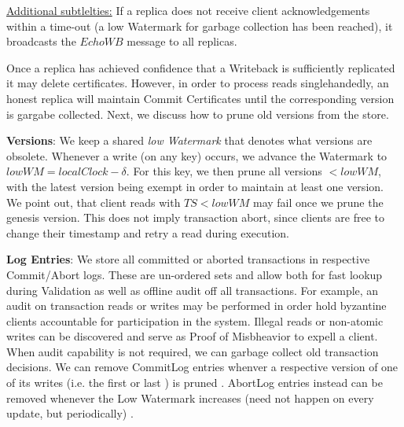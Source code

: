 \underline{Additional subtlelties:} If a replica does not receive client acknowledgements within a time-out (a low Watermark for garbage collection has been reached), it broadcasts the $EchoWB$ message to all replicas. 

Once a replica has achieved confidence that a Writeback is sufficiently replicated it may delete certificates. However, in order to process reads singlehandedly, an honest replica will maintain Commit Certificates until the corresponding version is gargabe collected. Next, we discuss how to prune old versions from the store.



\textbf{Versions}: We keep a shared \textit{low Watermark} that denotes what versions are obsolete. Whenever  a write (on any key) occurs, we advance the Watermark to $lowWM = localClock - \delta$. For this key, we then prune all versions $< lowWM$, with the latest version being exempt in order to maintain at least one version.  We point out, that client reads with $TS < lowWM$ may fail once we prune the genesis version. This does not imply transaction abort, since clients are free to change their timestamp and retry a read during execution.

\textbf{Log Entries}: We store all committed or aborted transactions in respective Commit/Abort logs. These are un-ordered sets and allow both for fast lookup during Validation as well as offline audit off all transactions. For example, an audit on transaction reads or writes may be performed in order hold byzantine clients accountable for participation in the system. Illegal reads or non-atomic writes can be discovered and serve as Proof of Misbheavior to expell a client. When audit capability is not required, we can garbage collect old transaction decisions. We can remove CommitLog entries whenver a respective version of one of its writes (i.e. the first  or last ) is pruned . AbortLog entries instead can be removed whenever the Low Watermark increases (need not happen on every update, but periodically) . 

